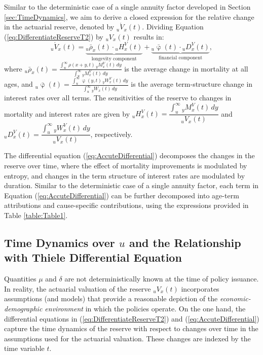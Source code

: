 \documentclass[12pt]{article}
\begin{document}
{Similar to the deterministic case of a single annuity factor developed in Section \ref{sec:TimeDynamics}, we aim to derive a closed expression for the relative change in the actuarial reserve, denoted by ${}_u\acute{V}_x(t)$. Dividing Equation (\ref{eq:DifferentiateReserveT2}) by ${}_uV_x(t)$ results in:
\begin{equation}\label{eq:AccuteDifferential}
	{}_u\acute{V}_x(t) = \underbrace{{}_u\bar{\rho}_x(t) \cdot {}_uH_x^V(t)}_\text{longevity component} + \underbrace{{}_u\bar{\upvarphi}(t) \cdot {}_uD_x^V(t)}_\text{financial component},
\end{equation}
where ${}_u\bar{\rho}_x(t) = \frac{\int_u^\infty \rho(x+y,t) \, {}_yM^V_x(t) \, dy}{\int_u^\infty {}_yM^V_x(t) \, dy}$ is the average change in mortality at all ages, and ${}_u\bar{\upvarphi}(t) = \frac{\int_u^\infty \upvarphi(y,t) \, {}_yW^V_x(t) \, dy}{\int_u^\infty {}_yW_x(t) \, dy}$ is the average term-structure change in interest rates over all terms. The sensitivities of the reserve to changes in mortality and interest rates are given by ${}_uH_x^V(t) = \dfrac{\int_{u}^{\infty} {}_yM^V_x(t) \, dy}{{}_uV_x(t)}$ and ${}_uD_x^V(t) = \dfrac{\int_{u}^{\infty} {}_yW^V_x(t) \, dy}{{}_uV_x(t)}$, respectively.

The differential equation (\ref{eq:AccuteDifferential}) decomposes the changes in the reserve over time, where the effect of mortality improvements is modulated by entropy, and changes in the term structure of interest rates are modulated by duration. Similar to the deterministic case of a single annuity factor, each term in Equation (\ref{eq:AccuteDifferential}) can be further decomposed into age-term attributions and cause-specific contributions, using the expressions provided in Table \ref{table:Table1}.



\subsection{Time Dynamics over $u$ and the Relationship with Thiele Differential Equation}\label{sec:ThieleEquations}


Quantities \( \mu \) and \( \delta \) are not deterministically known at the time of policy issuance. In reality, the actuarial valuation of the reserve \( {}_uV_x(t) \) incorporates assumptions (and models) that provide a reasonable depiction of the \textit{economic-demographic environment} in which the policies operate. On the one hand, the differential equations in (\ref{eq:DifferentiateReserveT2}) and (\ref{eq:AccuteDifferential}) capture the time dynamics of the reserve with respect to changes over time in the assumptions used for the actuarial valuation. These changes are indexed by the time variable \( t \).

}
\end{document}
